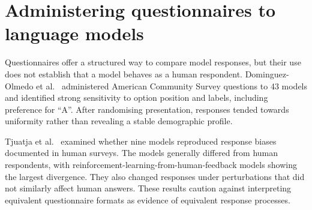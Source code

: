 
\section{Administering questionnaires to language models}\label{sec:bg-surveys}

Questionnaires offer a structured way to compare model responses, but their
use does not establish that a model behaves as a human respondent.
Dominguez-Olmedo et al.\ \cite{dominguez2024questioning} administered
American Community Survey questions to 43 models and identified strong
sensitivity to option position and labels, including preference for ``A''.
After randomising presentation, responses tended towards uniformity rather
than revealing a stable demographic profile.

Tjuatja et al.\ \cite{tjuatja2024response} examined whether nine models
reproduced response biases documented in human surveys. The models generally
differed from human respondents, with reinforcement-learning-from-human-feedback
models showing the largest divergence. They also changed responses under
perturbations that did not similarly affect human answers.
These results caution against interpreting equivalent questionnaire formats
as evidence of equivalent response processes.

